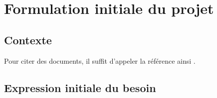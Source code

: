 \chapter{Formulation initiale du projet}


\section{Contexte}

Pour citer des documents, il suffit d'appeler la référence ainsi \cite{article}.


\section{Expression initiale du besoin}